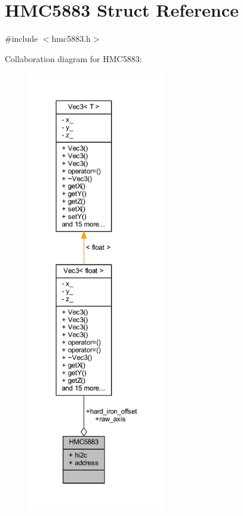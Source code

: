 \hypertarget{struct_h_m_c5883}{}\section{H\+M\+C5883 Struct Reference}
\label{struct_h_m_c5883}


{\ttfamily \#include $<$hmc5883.\+h$>$}



Collaboration diagram for H\+M\+C5883\+:
\nopagebreak
\begin{figure}[H]
\begin{center}
\leavevmode
\includegraphics[height=550pt]{struct_h_m_c5883__coll__graph}
\end{center}
\end{figure}

